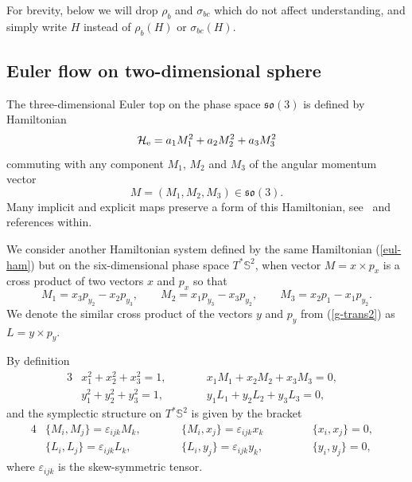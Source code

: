 \documentclass[pdftex]{sigma}
\numberwithin{equation}{section}
\begin{document}
For brevity, below we will drop $\rho_b$ and $\sigma_{bc}$ which do not affect understanding, and simply write $H$ instead of $\rho_b(H)$ or $\sigma_{bc}(H)$.

\subsection{Euler flow on two-dimensional sphere}
The three-dimensional Euler top on the phase space $\mathfrak{so}(3)$ is defined by Hamiltonian
\begin{equation}\label{eul-ham}
\mathcal H_{\rm e}=a_1M_1^2+a_2M_2^2+a_3M_3^2
\end{equation}
commuting with any component $M_1$, $M_2$ and $M_3$ of the angular momentum vector
\[M=(M_1,M_2,M_3)\in \mathfrak{so}(3).\]
Many implicit and explicit maps preserve a form of this Hamiltonian, see~\cite{ts18e} and references within.

We consider another Hamiltonian system defined by the same Hamiltonian (\ref{eul-ham}) but on the six-dimensional phase space $T^*\mathbb S^2$, when
vector $M=x\times p_{x}$ is a cross product of two vectors $x$ and $p_x$ so that
\[
M_1=x_3p_{y_2}-x_2p_{y_3} ,\qquad M_2=x_1p_{y_3}-x_3p_{y_2} ,\qquad M_3=x_2p_1-x_1p_{y_2}.
\]
We denote the similar cross product of the vectors $y$ and $p_y$ from (\ref{g-trans2}) as $L=y\times p_y$.

By definition
\begin{alignat}{3}
& x_1^2+x_2^2+x_3^2=1 , \qquad && x_1M_1+x_2M_2+x_3M_3=0 ,&\nonumber\\
\label{caz2}
 & y_1^2+y_2^2+y_3^2=1 ,\qquad && y_1L_1+y_2L_2+y_3L_3=0 ,&
\end{alignat}
and the symplectic structure on $T^*\mathbb S^2$ is given by the bracket
\begin{alignat}{4}
& \{M_{i}, M_{j}\}=\varepsilon_{ijk}M_{k} , \qquad&&
\{M_{i}, x_{j}\} =\varepsilon_{ijk}x_{k}   \qquad&&
&\{x_{i},x_{j}\}=0 , &\nonumber\\
\label{e3}
& \{L_{i}, L_{j}\}=\varepsilon_{ijk}L_{k} ,  \qquad&&
\{L_{i}, y_{j}\} =\varepsilon_{ijk}y_{k} ,  \quad&&
&\{y_{i},y_{j}\}=0 ,&
\end{alignat}
where $\varepsilon_{ijk}$ is the skew-symmetric tensor.
\end{document}
